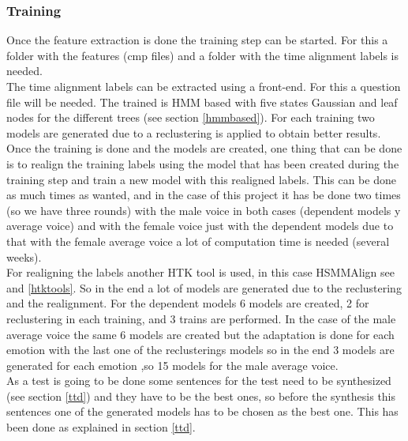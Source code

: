 \subsubsection{Training}\label{train}
Once the feature extraction is done the training step can be started. For this a folder with the features (cmp files) and a folder with the time alignment labels is needed.\\
The time alignment labels can be extracted using a front-end. For this a question file will be needed.
The trained is HMM based with five states Gaussian and leaf nodes for the different trees (see section \ref{hmmbased}). For each training two models are generated due to a reclustering is applied to obtain better results. 
Once the training is done and the models are created, one thing that can be done is to realign the training labels using the model that has been created during the training step and train a new model with this realigned labels. This can be done as much times as wanted, and in the case of this project it has be done two times (so we have three rounds) with the male voice in both cases (dependent models y average voice) and with the female voice just with the dependent models due to that with the female average voice a lot of computation time is needed (several weeks).\\
For realigning the labels another HTK tool is used, in this case HSMMAlign see \cite{htkbook} and \ref{htktools}.
So in the end a lot of models are generated due to the reclustering and the realignment. For the dependent models 6 models are created, 2 for reclustering in each training, and 3 trains are performed. In the case of the male average voice the same 6 models are created but the adaptation is done for each emotion with the last one of the reclusterings models so in the end 3 models are generated for each emotion ,so 15 models for the male average voice.\\
As a test is going to be done some sentences for the test need to be synthesized (see section \ref{ttd}) and they have to be the best ones, so before the synthesis this sentences one of the generated models has to be chosen as the best one. This has been done as explained in section \ref{ttd}.
